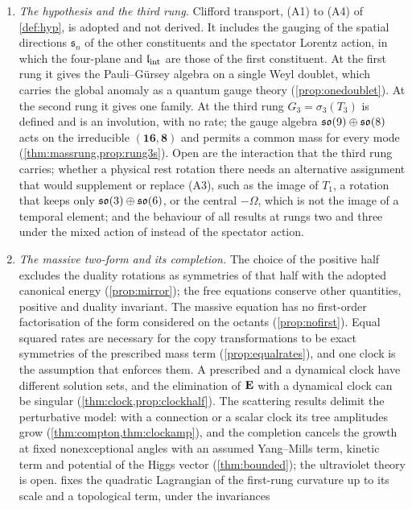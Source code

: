 \begin{enumerate}[leftmargin=2em,itemsep=4pt]
\item \emph{The hypothesis and the third rung.} Clifford transport, (A1) to (A4) of \cref{def:hyp}, is adopted and not derived. It includes
the gauging of the spatial directions $\mathfrak s_n$ of the other constituents and the spectator Lorentz action, in which the four-plane and
$\mathfrak l_{\rm int}$ are those of the first constituent. At the first rung it gives the Pauli--G\"ursey algebra on a single Weyl doublet, which carries
the global anomaly as a quantum gauge theory (\cref{prop:onedoublet}). At the second rung it gives one family. At the third rung
$G_3=\sigma_3(T_3)$ is defined and is an involution, with no rate; the gauge algebra $\mathfrak{so}(9)\oplus\mathfrak{so}(8)$ acts on the irreducible
$(\mathbf{16},\mathbf8)$ and permits a common mass for every mode (\cref{thm:massrung,prop:rung3s}). Open are the interaction that the third
rung carries; whether a physical rest rotation there needs an alternative assignment that would supplement or replace (A3), such as the
image of $T_1$, a rotation that keeps only $\mathfrak{so}(3)\oplus\mathfrak{so}(6)$, or the central $-\Omega$, which is not the image of a temporal element; and the
behaviour of all results at rungs two and three under the mixed action of  instead of the spectator action.
\item \emph{The massive two-form and its completion.} The choice of the positive half excludes the duality rotations as symmetries of that
half with the adopted canonical energy (\cref{prop:mirror}); the free equations conserve other quantities, positive and duality invariant.
The massive equation has no first-order factorisation of the form considered on the octants (\cref{prop:nofirst}). Equal squared rates are
necessary for the copy transformations to be exact symmetries of the prescribed mass term (\cref{prop:equalrates}), and one clock is the
assumption that enforces them. A prescribed and a dynamical clock have different solution sets, and the elimination of $\mathbf E$ with a dynamical
clock can be singular (\cref{thm:clock,prop:clockhalf}). The scattering results delimit the perturbative model: with a connection or a
scalar clock its tree amplitudes grow (\cref{thm:compton,thm:clockamp}), and the completion cancels the growth at fixed nonexceptional angles
with an assumed Yang--Mills term, kinetic term and potential of the Higgs vector (\cref{thm:bounded}); the ultraviolet theory is open.
 fixes the quadratic Lagrangian of the first-rung curvature up to its scale and a topological term, under the invariances

\end{enumerate}
